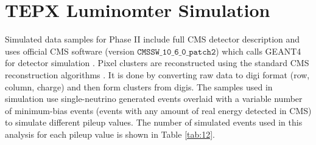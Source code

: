


\section{TEPX Luminomter Simulation}

 Simulated data samples for Phase II include full CMS detector description and uses official CMS software (version $\texttt{CMSSW\_10\_6\_0\_patch2}$) which calls GEANT4 for detector simulation \cite{GEANT4:2002zbu}.  Pixel clusters are reconstructed using the standard CMS reconstruction algorithms \cite{cmssw_2024}. It is done by converting raw data to digi format (row, column, charge) and then form clusters from digis. The samples used in simulation use single-neutrino generated events overlaid with a variable number of minimum-bias events (events with any amount of real energy detected in CMS) to simulate different pileup values.  The number of simulated events used in this analysis for each pileup value is shown in Table \ref{tab:12}.
 
